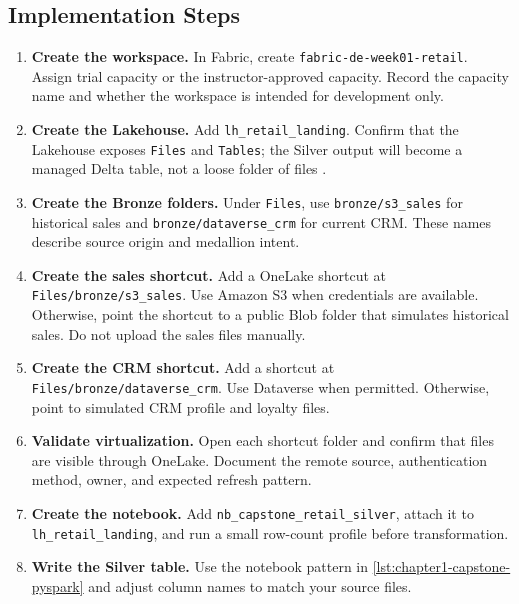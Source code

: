 \subsection*{Implementation Steps}
\begin{enumerate}
    \item \textbf{Create the workspace.} In Fabric, create \texttt{fabric-de-week01-retail}. Assign trial capacity or the instructor-approved capacity. Record the capacity name and whether the workspace is intended for development only.
    \item \textbf{Create the Lakehouse.} Add \texttt{lh\_retail\_landing}. Confirm that the Lakehouse exposes \texttt{Files} and \texttt{Tables}; the Silver output will become a managed Delta table, not a loose folder of files \cite{microsoftFabricLakehouse}.
    \item \textbf{Create the Bronze folders.} Under \texttt{Files}, use \texttt{bronze/s3\_sales} for historical sales and \texttt{bronze/dataverse\_crm} for current CRM. These names describe source origin and medallion intent.
    \item \textbf{Create the sales shortcut.} Add a OneLake shortcut at \texttt{Files/bronze/s3\_sales}. Use Amazon S3 when credentials are available. Otherwise, point the shortcut to a public Blob folder that simulates historical sales. Do not upload the sales files manually.
    \item \textbf{Create the CRM shortcut.} Add a shortcut at \texttt{Files/bronze/dataverse\_crm}. Use Dataverse when permitted. Otherwise, point to simulated CRM profile and loyalty files.
    \item \textbf{Validate virtualization.} Open each shortcut folder and confirm that files are visible through OneLake. Document the remote source, authentication method, owner, and expected refresh pattern.
    \item \textbf{Create the notebook.} Add \texttt{nb\_capstone\_retail\_silver}, attach it to \texttt{lh\_retail\_landing}, and run a small row-count profile before transformation.
    \item \textbf{Write the Silver table.} Use the notebook pattern in \cref{lst:chapter1-capstone-pyspark} and adjust column names to match your source files.
\end{enumerate}

